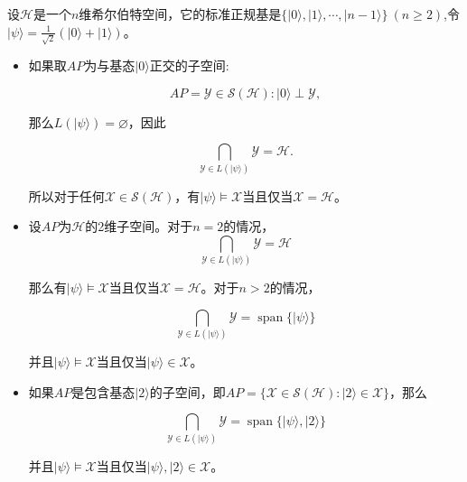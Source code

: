 \begin{example}
    设$\mathcal{H}$是一个$n$维希尔伯特空间，它的标准正规基是$\{|0\rangle, |1\rangle, \cdots, |n - 1\rangle\}\ (n \geq 2)$,令$|\psi\rangle = \frac{1}{\sqrt{2}}(|0\rangle + |1\rangle)$。
    \begin{itemize}
        \item 如果取$AP$为与基态$|0\rangle$正交的子空间:

        \begin{equation}
        AP = {\mathcal{Y} \in \mathcal{S}(\mathcal{H}) : |0\rangle \perp \mathcal{Y}},
        \end{equation}
        
        那么$L(|\psi\rangle) = \varnothing$，因此
        
        \begin{equation}
        {\bigcap_{\mathcal{Y} \in L(|\psi\rangle)} \mathcal{Y} = \mathcal{H}.}
        \end{equation}
        
        所以对于任何$\mathcal{X} \in \mathcal{S}(\mathcal{H})$，有$|\psi\rangle \models \mathcal{X}$当且仅当$\mathcal{X} = \mathcal{H}$。
        
        \item 设$AP$为$\mathcal{H}$的2维子空间。对于$n = 2$的情况，
        \begin{equation}
            {\bigcap_{\mathcal{Y} \in L(|\psi\rangle)} \mathcal{Y} = \mathcal{H}}
            \end{equation}
            
            那么有$|\psi\rangle \models \mathcal{X}$当且仅当$\mathcal{X} = \mathcal{H}$。对于$n > 2$的情况，
            
            \begin{equation}
            {\bigcap_{\mathcal{Y} \in L(|\psi\rangle)} \mathcal{Y} = \operatorname{span}\{|\psi\rangle}\}
            \end{equation}
            
            并且$|\psi\rangle \models \mathcal{X}$当且仅当$|\psi\rangle \in \mathcal{X}$。
            
        \item 如果$AP$是包含基态$|2\rangle$的子空间，即$AP = \{\mathcal{X} \in \mathcal{S}(\mathcal{H}) : |2\rangle \in \mathcal{X}\}$，那么
            
            \begin{equation}
            {\bigcap_{\mathcal{Y} \in L(|\psi\rangle)} \mathcal{Y} = \operatorname{span}\{|\psi\rangle, |2\rangle}\}
            \end{equation}
            
            并且$|\psi\rangle \models \mathcal{X}$当且仅当$|\psi\rangle,|2\rangle \in \mathcal{X}$。
    \end{itemize}

\end{example}
